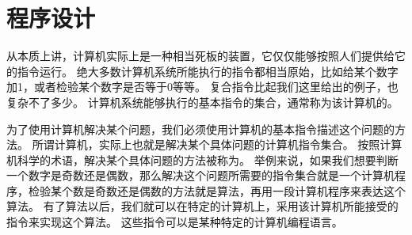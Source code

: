 \section{程序设计}
{
    从本质上讲，计算机实际上是一种相当死板的装置，它仅仅能够按照人们提供给它的指令运行。
    绝大多数计算机系统所能执行的指令都相当原始，比如给某个数字加1，或者检验某个数字是否等于0等等。
    复合指令比起我们这里给出的例子，也复杂不了多少。
    计算机系统能够执行的基本指令的集合，通常称为该计算机的。

    为了使用计算机解决某个问题，我们必须使用计算机的基本指令描述这个问题的方法。
    所谓计算机，实际上也就是解决某个具体问题的计算机指令集合。
    按照计算机科学的术语，解决某个具体问题的方法被称为。
    举例来说，如果我们想要判断一个数字是奇数还是偶数，那么解决这个问题所需要的指令集合就是一个计算机程序，检验某个数是奇数还是偶数的方法就是算法，再用一段计算机程序来表达这个算法。
    有了算法以后，我们就可以在特定的计算机上，采用该计算机所能接受的指令来实现这个算法。
    这些指令可以是某种特定的计算机编程语言。
}

\endinput
